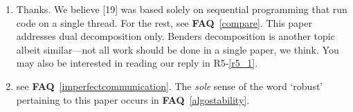 \documentclass[11pt]{article}
\newcommand{\faq}[1]{\textbf{FAQ}~\ref{#1}}
\begin{document}
\begin{enumerate}
\begin{enumerate}
        `divergence': this never happened and will never happen (see Theorem 1, 3, 4 in our revised manuscript, or you might to run our code).
        `outdated'/`suboptimal': they are \textit{defined behavior} and are acceptable.
        All your concerns here are handled automatically, see \faq{imperfectcommunication}.
        We are in the world of global optimization \faq{ourisglobal}, readers only need to focus on the validity.
        A `suboptimal solution' still admits of valid primal and dual bounds, so it is not an outlier.
    \end{enumerate}
    \item \label{like19} Thanks. We believe [19] was based solely on sequential programming that run code on a single thread.
    For the rest, see \faq{compare}.
    This paper addresses dual decomposition only.
    Benders decomposition is another topic albeit similar---not all work should be done in a single paper, we think.
    You may also be interested in reading our reply in R5-\ref{r5_1}.
    \item \label{r2_4} see \faq{imperfectcommunication}. 
    The \textit{sole} sense of the word `robust' pertaining to this paper occurs in \faq{algostability}.
\end{enumerate}
\end{document}
